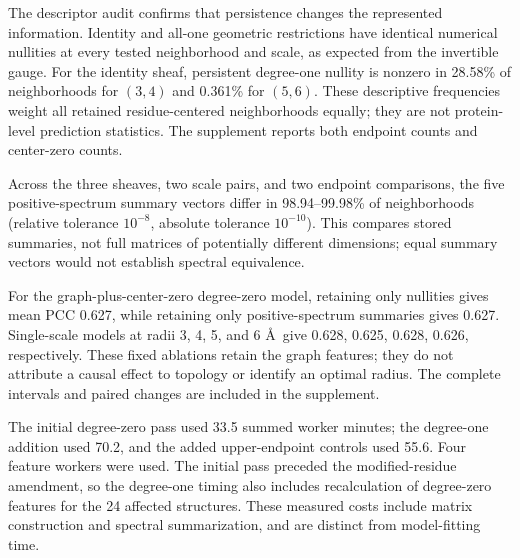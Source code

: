 The descriptor audit confirms that persistence changes the represented information. Identity and all-one geometric restrictions have identical numerical nullities at every tested neighborhood and scale, as expected from the invertible gauge. For the identity sheaf, persistent degree-one nullity is nonzero in 28.58\% of neighborhoods for $(3,4)$ and 0.361\% for $(5,6)$. These descriptive frequencies weight all retained residue-centered neighborhoods equally; they are not protein-level prediction statistics. The supplement reports both endpoint counts and center-zero counts.

Across the three sheaves, two scale pairs, and two endpoint comparisons, the five positive-spectrum summary vectors differ in 98.94--99.98\% of neighborhoods (relative tolerance $10^{-8}$, absolute tolerance $10^{-10}$). This compares stored summaries, not full matrices of potentially different dimensions; equal summary vectors would not establish spectral equivalence.

For the graph-plus-center-zero degree-zero model, retaining only nullities gives mean PCC 0.627, while retaining only positive-spectrum summaries gives 0.627. Single-scale models at radii 3, 4, 5, and 6 \AA\ give 0.628, 0.625, 0.628, 0.626, respectively. These fixed ablations retain the graph features; they do not attribute a causal effect to topology or identify an optimal radius. The complete intervals and paired changes are included in the supplement.

The initial degree-zero pass used 33.5 summed worker minutes; the degree-one addition used 70.2, and the added upper-endpoint controls used 55.6. Four feature workers were used. The initial pass preceded the modified-residue amendment, so the degree-one timing also includes recalculation of degree-zero features for the 24 affected structures. These measured costs include matrix construction and spectral summarization, and are distinct from model-fitting time.


